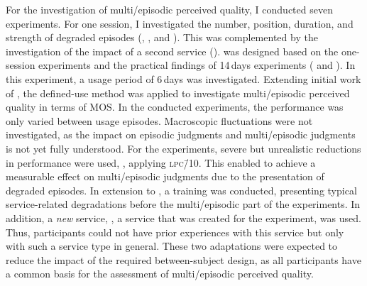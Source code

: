 For the investigation of multi\-/episodic perceived quality, I conducted seven experiments.
For one session, I investigated the number, position, duration, and strength of degraded episodes (, \EIIa{}, and ).
This was complemented by the investigation of the impact of a second service (\EIIb{}).
 was designed based on the one-session experiments and the practical findings of 14\,days experiments ( and ).
In this experiment, a usage period of 6\,days was investigated.
Extending initial work of \citet{moller_single-call_2011}, the defined-use method was applied to investigate multi\-/episodic perceived quality in terms of \ac{MOS}.
In the conducted experiments, the performance was only varied between usage episodes.
Macroscopic fluctuations were not investigated, as the impact on episodic judgments and multi\-/episodic judgments is not yet fully understood.
For the experiments, severe but unrealistic reductions in performance were used, \eg, applying \textsc{\lowercase{LPC\=/10}}.
This enabled to achieve a measurable effect on multi\-/episodic judgments due to the presentation of degraded episodes.
In extension to \citet{moller_single-call_2011}, a training was conducted, presenting typical service-related degradations before the multi\-/episodic part of the experiments.
In addition, a \emph{new} service, \ie, a service that was created for the experiment, was used.
Thus, participants could not have prior experiences with this service but only with such a service type in general.
These two adaptations were expected to reduce the impact of the required between-subject design, as all participants have a common basis for the assessment of multi\-/episodic perceived quality.

